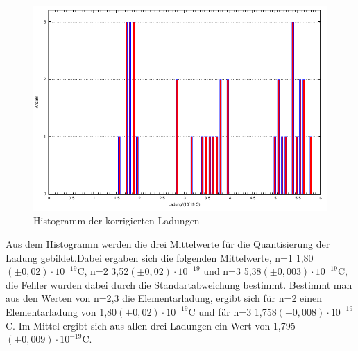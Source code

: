 \documentclass[12pt]{scrartcl}
\begin{document}
\begin{figure}[H] 
  \centering
    \includegraphics[scale = 1.3]{messung.pdf}
  	\caption[Histogramm der korrigierten Ladungen]{Histogramm der korrigierten Ladungen}
  \label{fig:histogramm}
\end{figure}

Aus dem Histogramm werden die drei Mittelwerte für die Quantisierung der Ladung gebildet.Dabei ergaben sich die folgenden Mittelwerte, n=1 \hspace*{4px} 1,80$(\pm0,02)\cdot 10^{-19}$C, n=2 \hspace*{4px} 3,52$(\pm 0,02)\cdot 10^{-19}$ und n=3 \hspace*{4px} 5,38$(\pm 0,003)\cdot 10^{-19}$C, die Fehler wurden dabei durch die Standartabweichung bestimmt. Bestimmt man aus den Werten von n=2,3 die Elementarladung, ergibt sich für n=2 einen Elementarladung von 1,80$(\pm 0,02)\cdot 10^{-19}$C und für n=3 \hspace*{4px} 1,758$(\pm 0,008)\cdot 10^{-19}$C.
Im Mittel ergibt sich aus allen drei Ladungen ein Wert von 1,795$(\pm 0,009)\cdot 10^{-19}$C.
\end{document}
